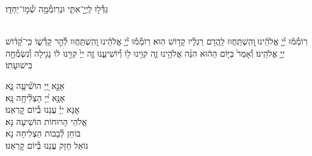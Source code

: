 \documentclass[twoside, openany, parskip=half, 11pt]{book}
\begin{document}
\shatz
גַּדְּ֯ל֣וּ לַֽיְיָ֣־אִתִּ֑י וּנְרֽוֹמְ֯מָ֖ה שְׁ֯מ֣וֹ־יַחְדָּֽו׃

\\
רֽוֹמְ֯מ֡וּ יְ֘יָ֤ אֱלֹהֵ֗ינוּ ֖וְהִֽשְׁתַּֽחֲווּ לַֽהֲדֹ֥ם רַגְלָ֗יו קָד֥וֹשׁ הֽוּא׃
רֽוֹמְ֯מ֡וּ יְ֘יָ֤ אֱלֹהֵ֗ינוּ ֖וְהִֽשְׁתַּֽחֲווּ לְ֯הַ֣ר קָדְ֯שׁ֑וֹ כִּֽי־קָ֝ד֗וֹשׁ יְיָ֥ אֱלֹהֵֽינוּ׃
וְ֯אָמַר֙ בַּיּ֣וֹם הַה֔וּא הִנֵּ֨ה אֱלֹהֵ֥ינוּ זֶ֛ה קִוִּ֥ינוּ ל֖וֹ וְ֯יוֹשִׁיעֵ֑נוּ זֶ֤ה יְיָ֙ קִוִּ֣ינוּ ל֔וֹ נָגִ֥ילָה וְ֯נִשְׂמְ֯חָ֖ה בִּישׁוּעָתֽוֹ׃



אָנָּ֣א יְ֭יָ הוֹשִׁ֘יעָ֥ה נָּ֑א\\
אָנָּ֥א יְ֝יָ הַצְלִ֘יחָ֥ה נָּֽא׃\\
אׇנָּא יְיָ֗ עֲנֵנוּ בְ֯יוֹם קׇרְאֵנוּ׃\\

אֱלֹהֵי הָרוּחוֹת הוֹשִׁיעָה נָּא׃\\ בּוֹחֵן לְ֯בָבוֹת הַצְלִיחָה נָא׃\\ גּוֹאֵל חָזָק עֲנֵנוּ בְ֯יוֹם קׇרְאֵנוּ׃


\end{document}
